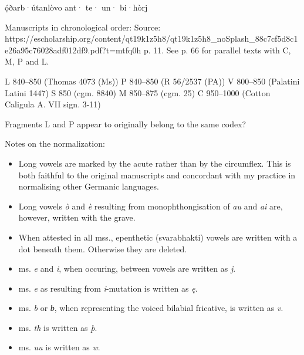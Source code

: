  ǫ́ðarb·útanlòvo ant· te· un· bi·hòrj

Manuscripts in chronological order:
  Source: https://escholarship.org/content/qt19k1z5h8/qt19k1z5h8_noSplash_88c7cf5d8c1e26a95c76028adf012df9.pdf?t=mtfq0h p. 11.
  See p. 66 for parallel texts with C, M, P and L.


  L 840–850 (Thomas 4073 (Ms))
  P 840–850 (R 56/2537 (PA))
  V 800–850 (Palatini Latini 1447)
  S 850 (cgm. 8840)
  M 850–875 (cgm. 25)
  C 950–1000 (Cotton Caligula A. VII sign. 3-11)

Fragments L and P appear to originally belong to the same codex?


Notes on the normalization:
  \begin{itemize}
    \item Long vowels are marked by the acute rather than by the circumflex. This is both faithful to the original manuscripts and concordant with my practice in normalising other Germanic languages.
    \item Long vowels \emph{ò} and \emph{è} resulting from monophthongisation of \emph{au} and \emph{ai} are, however, written with the grave.
    \item When attested in all mss., epenthetic (svarabhakti) vowels are written with a dot beneath them. Otherwise they are deleted.
    \item ms. \emph{e} and \emph{i}, when occuring, between vowels are written as \emph{j}.
    \item ms. \emph{e} as resulting from \emph{i}-mutation is written as \emph{ę}.
    \item ms. \emph{b} or \emph{ƀ}, when representing the voiced bilabial fricative, is written as \emph{v}.
    \item ms. \emph{th} is written as \emph{þ}.
    \item ms. \emph{uu} is written as \emph{w}.
  \end{itemize}

\sectionline

